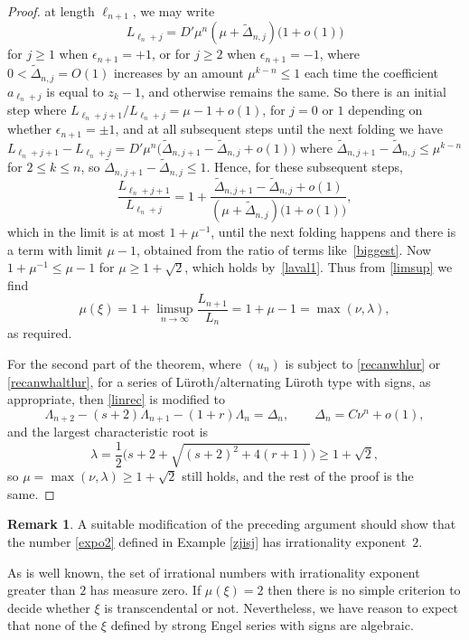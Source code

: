 \documentclass[12pt,a4paper]{amsart}
\theoremstyle{definition}
\newtheorem{remark}[theorem]{Remark}
\numberwithin{equation}{section}
\newcommand\la{{\lambda}}
\newcommand\La{{\Lambda}}
\newcommand\eps{{\epsilon}}
\begin{document}
\begin{proof}
at length $\ell_{n+1}$, we may write 
\[ 
L_{\ell_n+j} = D'\mu^n(\mu +\tilde{\Delta}_{n,j})\big(1+o(1)\big)
\] 
for $j\geq 1$ when $\eps_{n+1} = +1$, or for $j\geq 2$ when $\eps_{n+1} = -1$, 
where $0<\tilde{\Delta}_{n,j} = O(1)$ increases by an amount $\mu^{k-n}\leq 1$ each time 
the coefficient $a_{\ell_n+j}$ is equal to $z_k-1$, and otherwise remains the same. So 
there is an initial step where 
${L_{\ell_{n}+j+1}}/{L_{\ell_n+j}} = \mu-1+o(1)$, for $j=0$ or $1$ depending on whether 
$\eps_{n+1} = \pm1$, and at all subsequent steps until 
the next folding we have 
$L_{\ell_{n}+j+1}-L_{\ell_n+j} = D'\mu^n\big(\tilde{\Delta}_{n,j+1}-\tilde{\Delta}_{n,j}+o(1)\big)$ where 
$\tilde{\Delta}_{n,j+1}-\tilde{\Delta}_{n,j}\leq \mu^{k-n}$ 
for $2\leq k\leq n$, so $\tilde{\Delta}_{n,j+1}-\tilde{\Delta}_{n,j}\leq 1$. Hence, for these subsequent steps, 
\[ 
  \frac{L_{\ell_{n}+j+1}}{L_{\ell_n+j}}
  = 1 + \frac{\tilde{\Delta}_{n,j+1} - \tilde{\Delta}_{n,j} + o(1)}
  {(\mu +\tilde{\Delta}_{n,j})\big(1+o(1)\big)}, 
\]
which in the limit %
is at most $1+\mu^{-1}$, until the next 
folding happens and there is a term with limit %
$\mu-1$, obtained 
from the ratio of terms like~\eqref{biggest}. Now $1+\mu^{-1}\leq \mu-1$ for 
$\mu\geq 1+\sqrt{2}$, which holds by~\eqref{laval1}. Thus from \eqref{limsup} we find 
\[ 
\mu(\xi) = 1+\limsup\limits_{n\to\infty} \frac{L_{n+1}}{L_n} = 1+\mu-1=\max(\nu,\la), 
\] 
as required. 

For the second part of the theorem, where $(u_n)$ is subject to \eqref{recanwhlur} or \eqref{recanwhaltlur}, 
for a series of L\"uroth/alternating L\"uroth type with signs, as appropriate, then 
\eqref{linrec} is modified to 
\[ 
\La_{n+2}-(s+2)\La_{n+1}-(1+r)\La_n = \Delta_n, \qquad \Delta_n=C\nu^n +o(1), 
\] 
and the largest characteristic root is 
\[
\la=\frac{1}{2}\Big(s+2+\sqrt{(s+2)^2+4(r+1)}\Big)\geq 1+\sqrt{2}, 
\]
so $\mu=\max(\nu,\la)\geq 1+\sqrt{2}$ still holds, and the rest of the 
proof is the same.
\end{proof} 

\begin{remark} 
A suitable modification of the preceding argument 
should show that the number \eqref{expo2} defined in Example \ref{zjisj} has irrationality exponent~$2$.
\end{remark}

As is well known, the set of irrational numbers with irrationality exponent greater than $2$ has measure zero. 
If $\mu(\xi) = 2$ then there is no simple criterion to decide whether $\xi$ is transcendental or not. 
Nevertheless, we have reason to expect that none of the $\xi$ defined by strong Engel series with signs 
are algebraic. 
\end{document}
